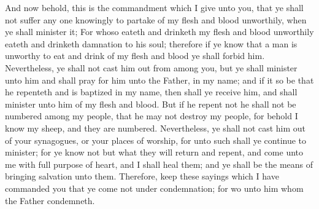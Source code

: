 And now behold, this is the commandment which I give unto you, that ye shall not suffer any one knowingly to partake of my flesh and blood unworthily, when ye shall minister it;
\bverse \iffalse For whoso eateth and drinketh my flesh and blood unworthily eateth and drinketh damnation to his soul; therefore if ye know that a man is unworthy to eat and drink of my flesh and blood ye shall forbid him. \fi
For whoso eateth and drinketh my flesh and blood unworthily eateth and drinketh damnation to his soul; therefore if ye know that a man is unworthy to eat and drink of my flesh and blood ye shall forbid him.
\bverse \iffalse Nevertheless, ye shall not cast him out from among you, but ye shall minister unto him and shall pray for him unto the Father, in my name; and if it so be that he repenteth and is baptized in my name, then shall ye receive him, and shall minister unto him of my flesh and blood. \fi
Nevertheless, ye shall not cast him out from among you, but ye shall minister unto him and shall pray for him unto the Father, in my name; and if it so be that he repenteth and is baptized in my name, then shall ye receive him, and shall minister unto him of my flesh and blood.
\bverse \iffalse But if he repent not he shall not be numbered among my people, that he may not destroy my people, for behold I know my sheep, and they are numbered. \fi
But if he repent not he shall not be numbered among my people, that he may not destroy my people, for behold I know my sheep, and they are numbered.
\bverse \iffalse Nevertheless, ye shall not cast him out of your synagogues, or your places of worship, for unto such shall ye continue to minister; for ye know not but what they will return and repent, and come unto me with full purpose of heart, and I shall heal them; and ye shall be the means of bringing salvation unto them. \fi
Nevertheless, ye shall not cast him out of your synagogues, or your places of worship, for unto such shall ye continue to minister; for ye know not but what they will return and repent, and come unto me with full purpose of heart, and I shall heal them; and ye shall be the means of bringing salvation unto them.
\bverse \iffalse Therefore, keep these sayings which I have commanded you that ye come not under condemnation; for wo unto him whom the Father condemneth. \fi
Therefore, keep these sayings which I have commanded you that ye come not under condemnation; for wo unto him whom the Father condemneth.
\bverse \iffalse And I give you these commandments because of the disputations which have been among you. And blessed are ye if ye have no disputations among you. \fi
